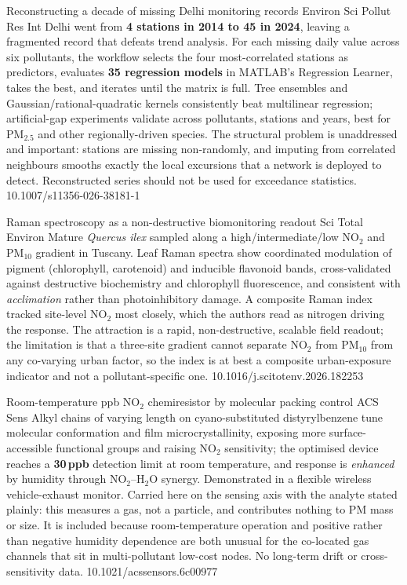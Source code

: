 \documentclass[10pt]{article}
\begin{document}
{Reconstructing a decade of missing Delhi monitoring records}
{Environ Sci Pollut Res Int}
{Delhi went from \textbf{4 stations in 2014 to 45 in 2024}, leaving a fragmented record
that defeats trend analysis. For each missing daily value across six pollutants, the
workflow selects the four most-correlated stations as predictors, evaluates \textbf{35
regression models} in MATLAB's Regression Learner, takes the best, and iterates until the
matrix is full. Tree ensembles and Gaussian/rational-quadratic kernels consistently beat
multilinear regression; artificial-gap experiments validate across pollutants, stations
and years, best for PM$_{2.5}$ and other regionally-driven species. The structural problem
is unaddressed and important: stations are missing non-randomly, and imputing from
correlated neighbours smooths exactly the local excursions that a network is deployed to
detect. Reconstructed series should not be used for exceedance statistics.}
{10.1007/s11356-026-38181-1}

{Raman spectroscopy as a non-destructive biomonitoring readout}
{Sci Total Environ}
{Mature \textit{Quercus ilex} sampled along a high/intermediate/low NO$_2$ and PM$_{10}$
gradient in Tuscany. Leaf Raman spectra show coordinated modulation of pigment
(chlorophyll, carotenoid) and inducible flavonoid bands, cross-validated against
destructive biochemistry and chlorophyll fluorescence, and consistent with
\emph{acclimation} rather than photoinhibitory damage. A composite Raman index tracked
site-level NO$_2$ most closely, which the authors read as nitrogen driving the response.
The attraction is a rapid, non-destructive, scalable field readout; the limitation is that
a three-site gradient cannot separate NO$_2$ from PM$_{10}$ from any co-varying urban
factor, so the index is at best a composite urban-exposure indicator and not a
pollutant-specific one.}
{10.1016/j.scitotenv.2026.182253}

{Room-temperature ppb NO$_2$ chemiresistor by molecular packing control}
{ACS Sens}
{Alkyl chains of varying length on cyano-substituted distyrylbenzene tune molecular
conformation and film microcrystallinity, exposing more surface-accessible functional
groups and raising NO$_2$ sensitivity; the optimised device reaches a \textbf{30\,ppb}
detection limit at room temperature, and response is \emph{enhanced} by humidity through
NO$_2$--H$_2$O synergy. Demonstrated in a flexible wireless vehicle-exhaust monitor.
Carried here on the sensing axis with the analyte stated plainly: this measures a gas, not
a particle, and contributes nothing to PM mass or size. It is included because
room-temperature operation and positive rather than negative humidity dependence are both
unusual for the co-located gas channels that sit in multi-pollutant low-cost nodes. No
long-term drift or cross-sensitivity data.}
{10.1021/acssensors.6c00977}
\end{document}
